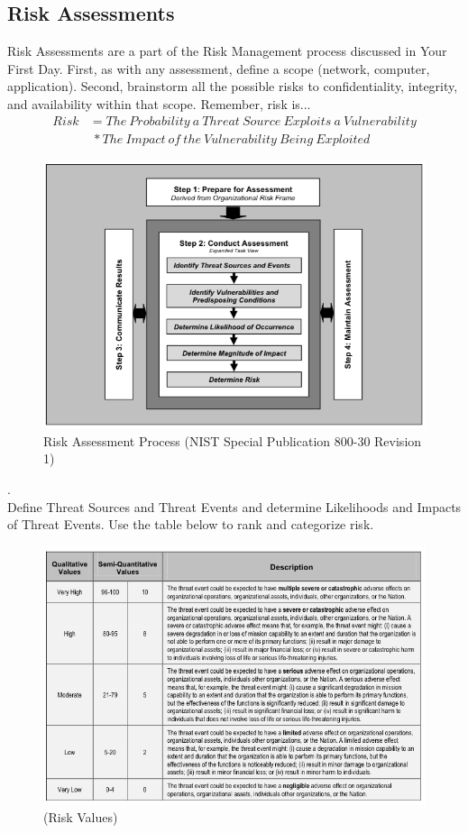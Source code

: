\subsection{Risk Assessments}
Risk Assessments are a part of the Risk Management process discussed in Your First Day. First, as with any assessment,  define a scope (network, computer, application). Second, brainstorm all the possible risks to confidentiality, integrity, and availability within that scope. Remember, risk is...
\begin{align}
Risk &= The\ Probability\ a\ Threat\ Source\ Exploits\ a\ Vulnerability \nonumber \\ &\ * The\ Impact\ of\ the\ Vulnerability\ Being\ Exploited
\end{align}
\begin{figure}[h]
\centering\includegraphics[scale=.55]{./img/RiskAssessmentProcess}
\caption{Risk Assessment Process (NIST Special Publication 800-30 Revision 1)}
\end{figure}
.\\
Define Threat Sources and Threat Events and determine Likelihoods and Impacts of Threat Events. Use the table below to rank and categorize risk.
\begin{figure}[h]
\centering\includegraphics[scale=.55]{./img/QualitativeValues}
\caption{(Risk Values)}
\end{figure}
